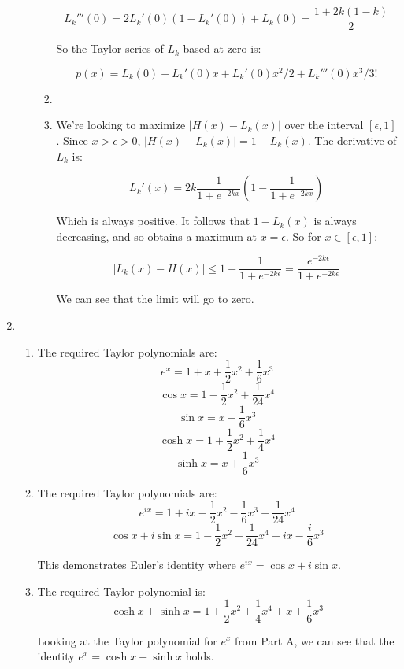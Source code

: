 \begin{enumerate}
\begin{enumerate}
\begin{enumerate}
                \[L_k'''(0) = 2L_k'(0)(1-L_k'(0)) + L_k(0) = \frac{1+2k(1-k)}{2}\]

                So the Taylor series of $L_k$ based at zero is:

                \[p(x) = L_k(0) + L_k'(0)x +L_k'(0)x^2/2 + L_k'''(0)x^3/3!\]
                \item 
                
                \item We're looking to maximize $|H(x)-L_k(x)|$ over the interval $[\epsilon, 1]$. Since $x > \epsilon >0$, $|H(x) - L_k(x)| = 1 - L_k(x)$. The derivative of $L_k$ is:

                \[L_k'(x) = 2k\frac{1}{1+e^{-2kx}}(1-\frac{1}{1+e^{-2kx}})\]

                Which is always positive. It follows that $1-L_k(x)$ is always decreasing, and so obtains a maximum at $x = \epsilon$. 
                So for $x \in [\epsilon, 1]$:

                \[|L_k(x)-H(x)| \leq 1 -\frac{1}{1+e^{-2k\epsilon}} = \frac{e^{-2k\epsilon}}{1 + e^{-2k \epsilon}}\]

                We can see that the limit will go to zero. 
                
                \end{enumerate}


                
			\end{enumerate}
			\item \begin{enumerate}
				\item The required Taylor polynomials are:
                \[e^x = 1 + x + \frac{1}{2}x^2 + \frac{1}{6}x^3\]
                \[\cos{x} = 1 - \frac{1}{2}x^2 + \frac{1}{24}x^4 \]
                \[\sin{x} = x - \frac{1}{6}x^3\]
                \[\cosh{x} = 1 + \frac{1}{2}x^2 + \frac{1}{4}x^4\]
                \[\sinh{x} = x + \frac{1}{6}x^3\]

                \item The required Taylor polynomials are:
                \[e^{ix} = 1 + ix - \frac{1}{2}x^2 - \frac{1}{6}x^3 + \frac{1}{24}x^4\]
                \[\cos{x} + i\sin{x} = 1 - \frac{1}{2}x^2 + \frac{1}{24}x^4 + ix - \frac{i}{6}x^3\]

                This demonstrates Euler's identity where $e^{ix} = \cos{x} + i\sin{x}$.

                \item The required Taylor polynomial is:
                \[\cosh{x} + \sinh{x} = 1 + \frac{1}{2}x^2 + \frac{1}{4}x^4 + x + \frac{1}{6}x^3\]

                Looking at the Taylor polynomial for $e^x$ from Part A, we can see that the identity $e^x = \cosh{x} + \sinh{x}$ holds.

			\end{enumerate}
		\end{enumerate}
